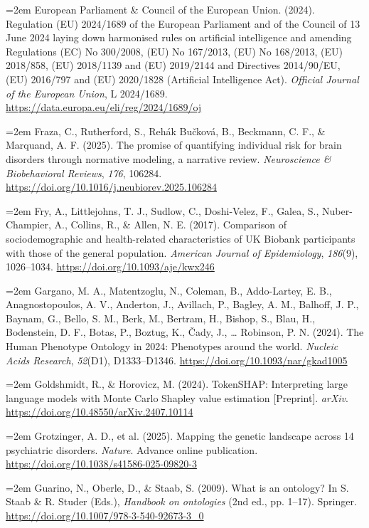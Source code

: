 \documentclass[11pt,a4paper,twoside]{article}
\begin{document}
\hangindent=2em European Parliament \& Council of the European Union. (2024). Regulation (EU) 2024/1689 of the European Parliament and of the Council of 13 June 2024 laying down harmonised rules on artificial intelligence and amending Regulations (EC) No 300/2008, (EU) No 167/2013, (EU) No 168/2013, (EU) 2018/858, (EU) 2018/1139 and (EU) 2019/2144 and Directives 2014/90/EU, (EU) 2016/797 and (EU) 2020/1828 (Artificial Intelligence Act). \textit{Official Journal of the European Union}, L 2024/1689. \url{https://data.europa.eu/eli/reg/2024/1689/oj}

\hangindent=2em Fraza, C., Rutherford, S., Reh\'{a}k Bu\v{c}kov\'{a}, B., Beckmann, C. F., \& Marquand, A. F. (2025). The promise of quantifying individual risk for brain disorders through normative modeling, a narrative review. \textit{Neuroscience \& Biobehavioral Reviews}, \textit{176}, 106284. \url{https://doi.org/10.1016/j.neubiorev.2025.106284}

\hangindent=2em Fry, A., Littlejohns, T. J., Sudlow, C., Doshi-Velez, F., Galea, S., Nuber-Champier, A., Collins, R., \& Allen, N. E. (2017). Comparison of sociodemographic and health-related characteristics of UK Biobank participants with those of the general population. \textit{American Journal of Epidemiology}, \textit{186}(9), 1026--1034. \url{https://doi.org/10.1093/aje/kwx246}

\hangindent=2em Gargano, M. A., Matentzoglu, N., Coleman, B., Addo-Lartey, E. B., Anagnostopoulos, A. V., Anderton, J., Avillach, P., Bagley, A. M., Balhoff, J. P., Baynam, G., Bello, S. M., Berk, M., Bertram, H., Bishop, S., Blau, H., Bodenstein, D. F., Botas, P., Boztug, K., \v{C}ady, J., \ldots{} Robinson, P. N. (2024). The Human Phenotype Ontology in 2024: Phenotypes around the world. \textit{Nucleic Acids Research}, \textit{52}(D1), D1333--D1346. \url{https://doi.org/10.1093/nar/gkad1005}

\hangindent=2em Goldshmidt, R., \& Horovicz, M. (2024). TokenSHAP: Interpreting large language models with Monte Carlo Shapley value estimation [Preprint]. \textit{arXiv}. \url{https://doi.org/10.48550/arXiv.2407.10114}

\hangindent=2em Grotzinger, A. D., et al. (2025). Mapping the genetic landscape across 14 psychiatric disorders. \textit{Nature}. Advance online publication. \url{https://doi.org/10.1038/s41586-025-09820-3}

\hangindent=2em Guarino, N., Oberle, D., \& Staab, S. (2009). What is an ontology? In S. Staab \& R. Studer (Eds.), \textit{Handbook on ontologies} (2nd ed., pp. 1--17). Springer. \url{https://doi.org/10.1007/978-3-540-92673-3_0}
\end{document}
